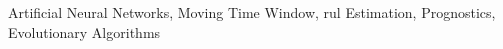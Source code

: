 \documentclass[twoside,11pt]{article}
\begin{document}
\begin{keywords}
  Artificial Neural Networks, Moving Time Window, \gls{rul} Estimation, Prognostics, Evolutionary Algorithms
\end{keywords}




%
%



\pagebreak
\appendix




\vskip 0.2in

\end{document}
